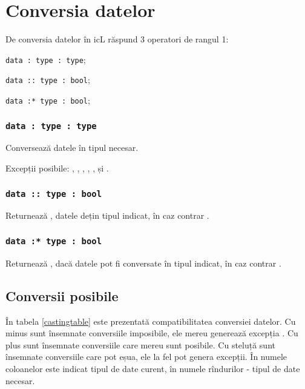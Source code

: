 \section{Conversia datelor}

De conversia datelor în icL răspund 3 operatori de rangul 1:
\begin{icItems}
	\item \lstinline|data : type : type|;
	\item \lstinline|data :: type : bool|;
	\item \lstinline|data :* type : bool|;
\end{icItems}

\subsubsection{\lstinline|data : type : type|}

Conversează datele în tipul necesar.

Excepții posibile: , , , , ,  și .

\subsubsection{\lstinline|data :: type : bool|}

Returnează \true, datele dețin tipul indicat, în caz contrar \false.

\subsubsection{\lstinline|data :* type : bool|}

Returnează \true, dacă datele pot fi conversate în tipul indicat, în caz contrar \false.

\subsection{Conversii posibile}

În tabela \ref{castingtable} este prezentată compatibilitatea conversiei datelor. Cu minus sunt însemnate conversiile imposibile, ele mereu generează excepția . Cu plus sunt însemnate conversiile care mereu sunt posibile. Cu steluță sunt însemnate conversiile care pot eșua, ele la fel pot genera excepții. În numele coloanelor este indicat tipul de date curent, în numele rîndurilor - tipul de date necesar.

